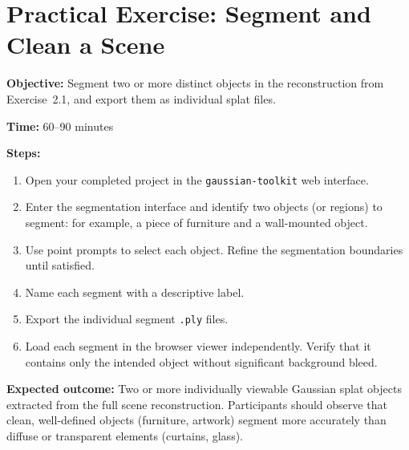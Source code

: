 \section{Practical Exercise: Segment and Clean a Scene}
\label{sec:adv-exercise}

\begin{tcolorbox}[
  enhanced,
  colback=SuccessGreen!8,
  colframe=SuccessGreen,
  fonttitle=\bfseries\sffamily,
  title={Exercise 4.1: Object Segmentation},
  sharp corners=south,
  boxrule=0.6pt
]
\textbf{Objective:} Segment two or more distinct objects in the reconstruction from Exercise~2.1, and export them as individual splat files.

\textbf{Time:} 60--90 minutes

\textbf{Steps:}
\begin{enumerate}
  \item Open your completed project in the \texttt{gaussian-toolkit} web interface.
  \item Enter the segmentation interface and identify two objects (or regions) to segment: for example, a piece of furniture and a wall-mounted object.
  \item Use point prompts to select each object. Refine the segmentation boundaries until satisfied.
  \item Name each segment with a descriptive label.
  \item Export the individual segment \texttt{.ply} files.
  \item Load each segment in the browser viewer independently. Verify that it contains only the intended object without significant background bleed.
\end{enumerate}

\textbf{Expected outcome:} Two or more individually viewable Gaussian splat objects extracted from the full scene reconstruction. Participants should observe that clean, well-defined objects (furniture, artwork) segment more accurately than diffuse or transparent elements (curtains, glass).
\end{tcolorbox}

